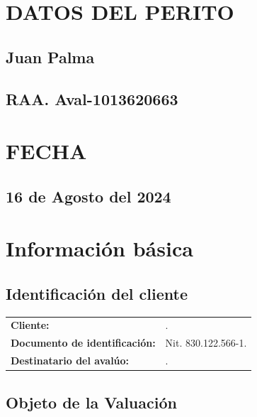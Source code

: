 \documentclass[12pt,a4paper,twoside]{article}
\begin{document}
{\bigskip 
\bigskip 
\bigskip 
\bigskip 
\bigskip 
\bigskip 

\section*{DATOS DEL PERITO}

\subsection*{Juan Palma}
\subsection*{RAA. Aval-1013620663}

\bigskip 
\bigskip 
\bigskip 
\bigskip 
\bigskip 
\bigskip 

\section*{FECHA}

\subsection*{16 de Agosto del 2024}
	


\clearpage

\tableofcontents

\clearpage


\section{Información básica}

\subsection{Identificación del cliente}

\begin{tabular}{ l p{7.5cm} }
	
	\textbf{Cliente:} & \Propietarios. \\
	\textbf{Documento de identificación:} & Nit. 830.122.566-1.\\
	\textbf{Destinatario del avalúo:} & \Propietarios. \\
	
\end{tabular}


\subsection{Objeto de la Valuación}

}
\end{document}
